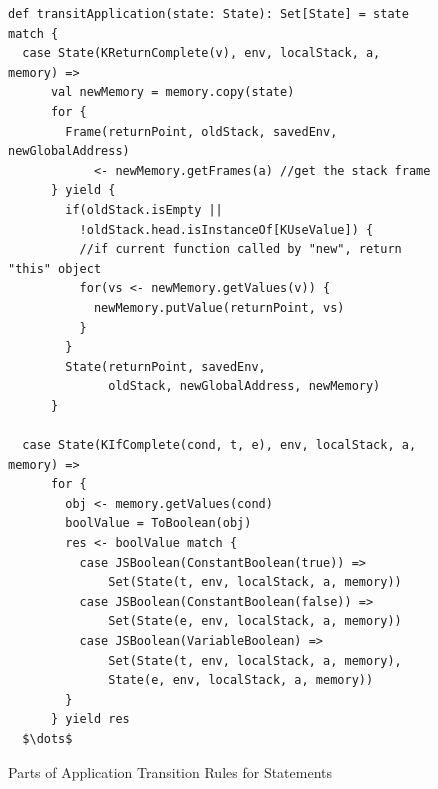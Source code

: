 \documentclass{article}
\begin{document}
\begin{figure}
\lstset{language=Scala, mathescape}
\begin{lstlisting}
def transitApplication(state: State): Set[State] = state match {
  case State(KReturnComplete(v), env, localStack, a, memory) =>
      val newMemory = memory.copy(state)
      for {
        Frame(returnPoint, oldStack, savedEnv, newGlobalAddress)
            <- newMemory.getFrames(a) //get the stack frame
      } yield {
        if(oldStack.isEmpty ||
          !oldStack.head.isInstanceOf[KUseValue]) {
          //if current function called by "new", return "this" object
          for(vs <- newMemory.getValues(v)) {
            newMemory.putValue(returnPoint, vs)
          }
        }
        State(returnPoint, savedEnv,
              oldStack, newGlobalAddress, newMemory)
      }

  case State(KIfComplete(cond, t, e), env, localStack, a, memory) =>
      for {
        obj <- memory.getValues(cond)
        boolValue = ToBoolean(obj)
        res <- boolValue match {
          case JSBoolean(ConstantBoolean(true)) =>
              Set(State(t, env, localStack, a, memory))
          case JSBoolean(ConstantBoolean(false)) =>
              Set(State(e, env, localStack, a, memory))
          case JSBoolean(VariableBoolean) =>
              Set(State(t, env, localStack, a, memory),
              State(e, env, localStack, a, memory))
        }
      } yield res
  $\dots$

\end{lstlisting}
\caption{Parts of Application Transition Rules for Statements}
\label{fig:app-stmt}
\end{figure}
\end{document}
